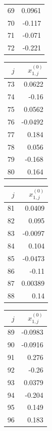 {\begin{tabular}[t]{r|r}
69 & 0.0961 \\
70 & -0.117 \\
71 & -0.071 \\
72 & -0.221
\end{tabular}\kern4pt
\begin{tabular}[t]{r|r}
$j$ & $x^{(0)}_{1,j}$ \\\hline
73 & 0.0622 \\
74 & -0.16 \\
75 & 0.0562 \\
76 & -0.0492 \\
77 & 0.184 \\
78 & 0.056 \\
79 & -0.168 \\
80 & 0.164
\end{tabular}\kern4pt
\begin{tabular}[t]{r|r}
$j$ & $x^{(0)}_{1,j}$ \\\hline
81 & 0.0409 \\
82 & 0.095 \\
83 & -0.0097 \\
84 & 0.104 \\
85 & -0.0473 \\
86 & -0.11 \\
87 & 0.00389 \\
88 & 0.14
\end{tabular}\kern4pt
\begin{tabular}[t]{r|r}
$j$ & $x^{(0)}_{1,j}$ \\\hline
89 & -0.0983 \\
90 & -0.0916 \\
91 & 0.276 \\
92 & -0.26 \\
93 & 0.0379 \\
94 & -0.204 \\
95 & 0.149 \\
96 & 0.183
\end{tabular}}

